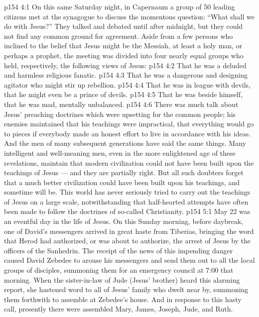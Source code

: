 \vs p154 4:1 On this same Saturday night, in Capernaum a group of 50 leading citizens met at the synagogue to discuss the momentous question: “What shall we do with Jesus?” They talked and debated until after midnight, but they could not find any common ground for agreement. Aside from a few persons who inclined to the belief that Jesus might be the Messiah, at least a holy man, or perhaps a prophet, the meeting was divided into four nearly equal groups who held, respectively, the following views of Jesus:
\vs p154 4:2 \bibnobreakspace That he was a deluded and harmless religious fanatic.
\vs p154 4:3 \bibnobreakspace That he was a dangerous and designing agitator who might stir up rebellion.
\vs p154 4:4 \bibnobreakspace That he was in league with devils, that he might even be a prince of devils.
\vs p154 4:5 \bibnobreakspace That he was beside himself, that he was mad, mentally unbalanced.
\vs p154 4:6 \pc There was much talk about Jesus’ preaching doctrines which were upsetting for the common people; his enemies maintained that his teachings were impractical, that everything would go to pieces if everybody made an honest effort to live in accordance with his ideas. And the men of many subsequent generations have said the same things. Many intelligent and well\hyp{}meaning men, even in the more enlightened age of these revelations, maintain that modern civilization could not have been built upon the teachings of Jesus --- and they are partially right. But all such doubters forget that a much better civilization could have been built upon his teachings, and sometime will be. This world has never seriously tried to carry out the teachings of Jesus on a large scale, notwithstanding that half\hyp{}hearted attempts have often been made to follow the doctrines of so\hyp{}called Christianity.
\vs p154 5:1 May 22 was an eventful day in the life of Jesus. On this Sunday morning, before daybreak, one of David’s messengers arrived in great haste from Tiberias, bringing the word that Herod had authorized, or was about to authorize, the arrest of Jesus by the officers of the Sanhedrin. The receipt of the news of this impending danger caused David Zebedee to arouse his messengers and send them out to all the local groups of disciples, summoning them for an emergency council at 7:00 that morning. When the sister\hyp{}in\hyp{}law of Jude (Jesus’ brother) heard this alarming report, she hastened word to all of Jesus’ family who dwelt near by, summoning them forthwith to assemble at Zebedee’s house. And in response to this hasty call, presently there were assembled Mary, James, Joseph, Jude, and Ruth.
